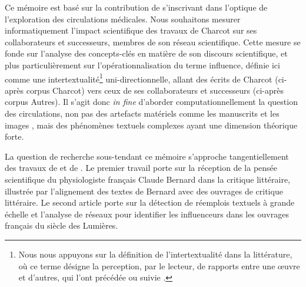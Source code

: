 Ce mémoire est basé sur la contribution de \citet{petkovic2023circulation} s'inscrivant dans l'optique de l'exploration des circulations médicales. Nous souhaitons mesurer informatiquement l'impact scientifique des travaux de Charcot sur ses collaborateurs et successeurs, membres de son réseau scientifique. Cette mesure se fonde sur l'analyse des concepts-clés en matière de son discours scientifique, et plus particulièrement sur l'opérationnalisation du terme \og{}influence\fg{}, définie ici comme une intertextualité\footnote{Nous nous appuyons sur la définition de l'intertextualité dans la littérature, où ce terme désigne \og{}la perception, par le lecteur, de rapports entre une \oe{}uvre et d'autres, qui l'ont précédée ou suivie\fg{} \citep[p.~4]{riffaterre1980trace}.} uni-directionnelle, allant des écrits de Charcot (ci-après corpus \og{}Charcot\fg{}) vers ceux de ses collaborateurs et successeurs (ci-après corpus \og{}Autres\fg{}). Il s'agit donc \textit{in fine} d'aborder computationnellement la question des circulations, non pas des artefacts matériels comme les manuscrits \citep{gabay2021katabase} et les images \citep{joyeux2019visual}, mais des phénomènes textuels complexes \citep{manjavacas} ayant une dimension théorique forte. 

La question de recherche sous-tendant ce mémoire s'approche tangentiellement des travaux de \citet{riguet2018impact} et de \citet{roe2023enlightenment}. Le premier travail porte sur la réception de la pensée scientifique du physiologiste français Claude Bernard dans la critique littéraire, illustrée par l'alignement des textes de Bernard avec des ouvrages de critique littéraire. Le second article porte sur la détection de réemplois textuels à grande échelle et l'analyse de réseaux pour identifier les \og{}influenceurs\fg{} dans les ouvrages français du siècle des Lumières.


%
